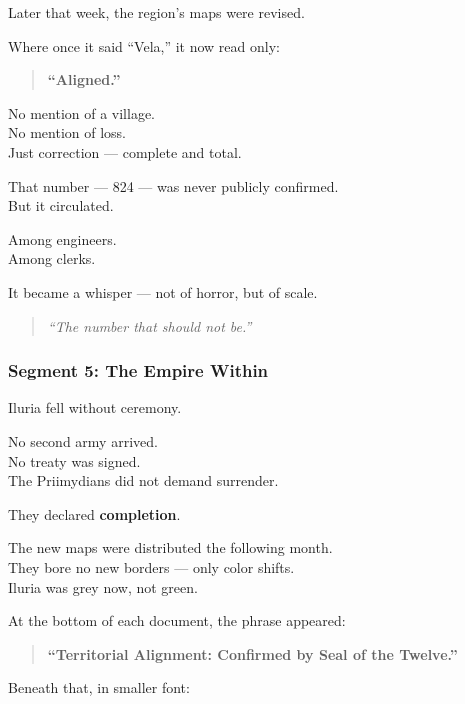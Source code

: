 \documentclass[9pt]{article}
\begin{document}
\vspace{1em}

Later that week, the region’s maps were revised.

Where once it said “Vela,” it now read only:

\begin{quote}
\textbf{“Aligned.”}
\end{quote}

No mention of a village.\\
No mention of loss.\\
Just correction — complete and total.

\vspace{1em}

That number — 824 — was never publicly confirmed.\\
But it circulated.

Among engineers.\\
Among clerks.

It became a whisper — not of horror, but of scale.

\begin{quote}
\textit{“The number that should not be.”}
\end{quote}

\newpage

\subsubsection*{Segment 5: The Empire Within}

Iluria fell without ceremony.

No second army arrived.\\
No treaty was signed.\\
The Priimydians did not demand surrender.

They declared \textbf{completion}.

\vspace{1em}

The new maps were distributed the following month.\\
They bore no new borders — only color shifts.\\
Iluria was grey now, not green.

At the bottom of each document, the phrase appeared:

\begin{quote}
\textbf{“Territorial Alignment: Confirmed by Seal of the Twelve.”}
\end{quote}

Beneath that, in smaller font:
\end{document}
